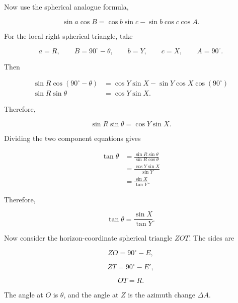 \documentclass[12pt]{extarticle}
\begin{document}
Now use the spherical analogue formula,

\begin{equation}
\sin a\cos B=\cos b\sin c-\sin b\cos c\cos A.
\label{eq:spherical-analogue}
\end{equation}

For the local right spherical triangle, take

\begin{equation} a=R, \qquad B=90^\circ-\theta, \qquad b=Y, \qquad c=X, \qquad A=90^\circ . \end{equation}

Then

\begin{align}
\sin R \cos(90^\circ-\theta)
&= \cos Y \sin X - \sin Y \cos X \cos(90^\circ) \\[4pt]
\sin R \sin\theta
&= \cos Y \sin X .
\end{align}

Therefore,

\begin{equation}
\boxed{\sin R\sin\theta=\cos Y\sin X}.
\label{eq:local-x-component}
\end{equation}

Dividing the two component equations gives

\begin{align}
\tan\theta
&= \frac{\sin R\sin\theta}{\sin R\cos\theta} \\[4pt]
&= \frac{\cos Y\sin X}{\sin Y} \\[4pt]
&= \frac{\sin X}{\tan Y}.
\end{align}

Therefore,

\begin{equation} \boxed{\tan\theta = \frac{\sin X}{\tan Y}}. \end{equation}

Now consider the horizon-coordinate spherical triangle $ZOT$. The sides are

\begin{equation} ZO = 90^\circ - E, \end{equation}

\begin{equation} ZT = 90^\circ - E', \end{equation}

\begin{equation} OT = R. \end{equation}

The angle at $O$ is $\theta$, and the angle at $Z$ is the azimuth change $\Delta A$.
\end{document}
